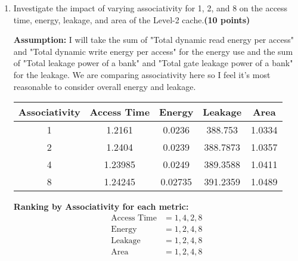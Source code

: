 \documentclass[a4paper, 11pt]{exam}
\begin{document}
\begin{enumerate}
\begin{enumerate}
    \item Investigate the impact of varying associativity for 1, 2, and 8 on the access time, energy, leakage, and area of the Level-2 cache.\textbf{(10 points)}
    
    \textbf{Assumption:} I will take the sum of "Total dynamic read energy per access" and "Total dynamic write energy per access" for the energy use and the sum of "Total leakage power of a bank" and "Total gate leakage power of a bank" for the leakage. We are comparing associativity here so I feel it's most reasonable to consider overall energy and leakage.
    
    \begin{center}
	\begin{tabular}{ |c|c|c|c|c|} 
		\hline
		\textbf{Associativity}& \textbf{Access Time}& \textbf{Energy} & \textbf{Leakage} & \textbf{Area} \\ 
		\hline
		1 & 1.2161 & 0.0236 & 388.753 & 1.0334\\
		\hline
		2 & 1.2404 & 0.0239 & 388.7873 & 1.0357 \\
		\hline
		4 & 1.23985 & 0.0249 & 389.3588 & 1.0411\\
		\hline
		8 & 1.24245 & 0.02735 & 391.2359 & 1.0489\\
		\hline
	\end{tabular}
\end{center}

\textbf{Ranking by Associativity for each metric:}
\begin{align*}
\text{Access Time} &= 1, 4, 2, 8\\
\text{Energy} &= 1, 2, 4, 8\\
\text{Leakage} &= 1, 2, 4, 8\\
\text{Area} &= 1, 2, 4, 8 \\
\end{align*}

\end{enumerate}

\end{enumerate}
\end{document}

